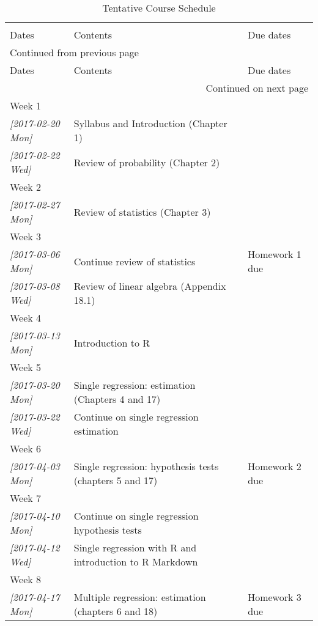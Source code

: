 \documentclass[a4paper,11pt]{article}
\begin{document}
{\small
\begin{longtable}{p{2.8cm}p{9cm}p{3cm}}
\caption{\label{tab:org978aebc}
Tentative Course Schedule}
\\
 &  & \\
Dates & Contents & Due dates\\
\hline
\endfirsthead
\multicolumn{3}{l}{Continued from previous page} \\

Dates & Contents & Due dates \\

\hline
\endhead
\hline\multicolumn{3}{r}{Continued on next page} \\
\endfoot
\endlastfoot
\hline
Week 1 &  & \\
\textit{[2017-02-20 Mon]} & Syllabus and Introduction (Chapter 1) & \\
\textit{[2017-02-22 Wed]} & Review of probability (Chapter 2) & \\
\hline
Week 2 &  & \\
\textit{[2017-02-27 Mon]} & Review of statistics (Chapter 3) & \\
\hline
Week 3 &  & \\
\textit{[2017-03-06 Mon]} & Continue review of statistics & Homework 1 due\\
\textit{[2017-03-08 Wed]} & Review of linear algebra (Appendix 18.1) & \\
\hline
Week 4 &  & \\
\textit{[2017-03-13 Mon]} & Introduction to R & \\
\hline
Week 5 &  & \\
\textit{[2017-03-20 Mon]} & Single regression: estimation (Chapters 4 and 17) & \\
\textit{[2017-03-22 Wed]} & Continue on single regression estimation & \\
\hline
Week 6 &  & \\
\textit{[2017-04-03 Mon]} & Single regression: hypothesis tests (chapters 5 and 17) & Homework 2 due\\
\hline
Week 7 &  & \\
\textit{[2017-04-10 Mon]} & Continue on single regression hypothesis tests & \\
\textit{[2017-04-12 Wed]} & Single regression with R and introduction to R Markdown & \\
\hline
Week 8 &  & \\
\textit{[2017-04-17 Mon]} & Multiple regression: estimation (chapters 6 and 18) & Homework 3 due\\

\end{longtable}}
\end{document}
